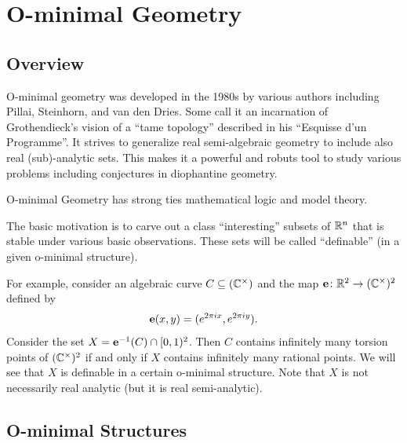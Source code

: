 \chapter{O-minimal Geometry}
\section{Overview}

O-minimal geometry was developed in the 1980s by various authors
including Pillai, Steinhorn, and van den Dries. Some call it an
incarnation of Grothendieck's vision of a ``tame topology'' described
in his ``Esquisse d'un Programme''. It strives to generalize real
semi-algebraic geometry to include also real (sub)-analytic sets.
This makes it a powerful and robuts tool to study various problems
including conjectures in diophantine geometry.

O-minimal Geometry has strong ties mathematical logic and model
theory. 

The basic motivation is to carve out a class ``interesting'' subsets
of ${\mathbb{R}}^n$ that is stable under various basic observations. These sets
will be called ``definable'' (in a given o-minimal structure). 

For example, consider an algebraic curve $C\subseteq ({\mathbb{C}}^\times)$ and
the map $\mathbf{e} \colon{\mathbb{R}}^2\rightarrow ({\mathbb{C}}^\times)^2$ defined by
\begin{equation*}
  \mathbf{e}(x,y) = (e^{2\pi i x},e^{2\pi i y}). 
\end{equation*}
Consider the set $X = \mathbf{e}^{-1}(C) \cap [0,1)^2$. Then $C$ contains
infinitely many torsion points of $({\mathbb{C}}^\times)^2$ if and only if $X$
contains infinitely many rational points.
We will see that $X$ is definable in a certain o-minimal structure.
Note that $X$ is not necessarily real analytic (but it is real
semi-analytic). 

\section{O-minimal Structures}


